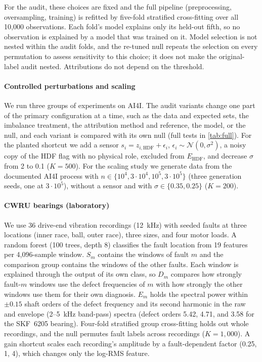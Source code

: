 \documentclass[10pt]{article}
\begin{document}
For the audit, these choices are fixed and the full pipeline (preprocessing, oversampling, training) is refitted by five-fold stratified cross-fitting over all 10{,}000 observations. Each fold's model explains only its held-out fifth, so no observation is explained by a model that was trained on it. Model selection is not nested within the audit folds, and the re-tuned null repeats the selection on every permutation to assess sensitivity to this choice; it does not make the original-label audit nested. Attributions do not depend on the threshold.


\paragraph{Controlled perturbations and scaling} We run three groups of experiments on AI4I. The audit variants change one part of the primary configuration at a time, such as the data and expected sets, the imbalance treatment, the attribution method and reference, the model, or the null, and each variant is compared with its own null (full tests in \cref{tab:full}). For the planted shortcut we add a sensor $s_i=z_{i,\mathrm{HDF}}+\epsilon_i$, $\epsilon_i\sim\mathcal{N}(0,\sigma^2)$, a noisy copy of the HDF flag with no physical role, excluded from $E_{\mathrm{HDF}}$, and decrease $\sigma$ from 2 to 0.1 ($K=500$). For the scaling study we generate data from the documented AI4I process with $n\in\{10^4,3\cdot10^4,10^5,3\cdot10^5\}$ (three generation seeds, one at $3\cdot10^5$), without a sensor and with $\sigma\in\{0.35,0.25\}$ ($K=200$).

\paragraph{CWRU bearings (laboratory)} We use 36 drive-end vibration recordings (12~kHz) with seeded faults at three locations (inner race, ball, outer race), three sizes, and four motor loads. A random forest (100 trees, depth 8) classifies the fault location from 19 features per 4{,}096-sample window. $S_m$ contains the windows of fault $m$ and the comparison group contains the windows of the other faults. Each window is explained through the output of its own class, so $D_m$ compares how strongly fault-$m$ windows use the defect frequencies of $m$ with how strongly the other windows use them for their own diagnosis. $E_m$ holds the spectral power within $\pm0.15$ shaft orders of the defect frequency and its second harmonic in the raw and envelope (2--5~kHz band-pass) spectra (defect orders 5.42, 4.71, and 3.58 for the SKF~6205 bearing). Four-fold stratified group cross-fitting holds out whole recordings, and the null permutes fault labels across recordings ($K=1{,}000$). A gain shortcut scales each recording's amplitude by a fault-dependent factor (0.25, 1, 4), which changes only the log-RMS feature.
\end{document}
